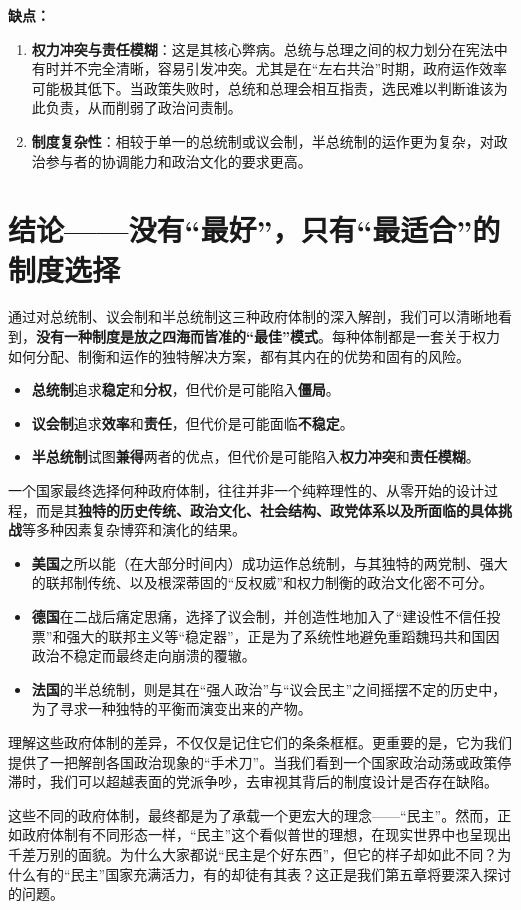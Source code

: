 \textbf{缺点：}

\begin{enumerate}
    \item \textbf{权力冲突与责任模糊}：这是其核心弊病。总统与总理之间的权力划分在宪法中有时并不完全清晰，容易引发冲突。尤其是在“左右共治”时期，政府运作效率可能极其低下。当政策失败时，总统和总理会相互指责，选民难以判断谁该为此负责，从而削弱了政治问责制。
    \item \textbf{制度复杂性}：相较于单一的总统制或议会制，半总统制的运作更为复杂，对政治参与者的协调能力和政治文化的要求更高。
\end{enumerate}

\hrulefill

\section{结论——没有“最好”，只有“最适合”的制度选择}

通过对总统制、议会制和半总统制这三种政府体制的深入解剖，我们可以清晰地看到，\textbf{没有一种制度是放之四海而皆准的“最佳”模式}。每种体制都是一套关于权力如何分配、制衡和运作的独特解决方案，都有其内在的优势和固有的风险。

\begin{itemize}
    \item \textbf{总统制}追求\textbf{稳定}和\textbf{分权}，但代价是可能陷入\textbf{僵局}。
    \item \textbf{议会制}追求\textbf{效率}和\textbf{责任}，但代价是可能面临\textbf{不稳定}。
    \item \textbf{半总统制}试图\textbf{兼得}两者的优点，但代价是可能陷入\textbf{权力冲突}和\textbf{责任模糊}。
\end{itemize}

一个国家最终选择何种政府体制，往往并非一个纯粹理性的、从零开始的设计过程，而是其\textbf{独特的历史传统、政治文化、社会结构、政党体系以及所面临的具体挑战}等多种因素复杂博弈和演化的结果。

\begin{itemize}
    \item \textbf{美国}之所以能（在大部分时间内）成功运作总统制，与其独特的两党制、强大的联邦制传统、以及根深蒂固的“反权威”和权力制衡的政治文化密不可分。
    \item \textbf{德国}在二战后痛定思痛，选择了议会制，并创造性地加入了“建设性不信任投票”和强大的联邦主义等“稳定器”，正是为了系统性地避免重蹈魏玛共和国因政治不稳定而最终走向崩溃的覆辙。
    \item \textbf{法国}的半总统制，则是其在“强人政治”与“议会民主”之间摇摆不定的历史中，为了寻求一种独特的平衡而演变出来的产物。
\end{itemize}

理解这些政府体制的差异，不仅仅是记住它们的条条框框。更重要的是，它为我们提供了一把解剖各国政治现象的“手术刀”。当我们看到一个国家政治动荡或政策停滞时，我们可以超越表面的党派争吵，去审视其背后的制度设计是否存在缺陷。

这些不同的政府体制，最终都是为了承载一个更宏大的理念——“民主”。然而，正如政府体制有不同形态一样，“民主”这个看似普世的理想，在现实世界中也呈现出千差万别的面貌。为什么大家都说“民主是个好东西”，但它的样子却如此不同？为什么有的“民主”国家充满活力，有的却徒有其表？这正是我们第五章将要深入探讨的问题。

